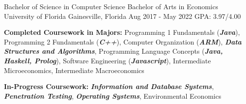 


\begin{cventries}

  \cventryedu
    {Bachelor of Science in Computer Science} %
    {Bachelor of Arts in Economics}
    {University of Florida} %
    {Gainesville, Florida} %
    {Aug 2017 - May 2022} %
    {GPA: 3.97/4.00}
    {
      \begin{cvitems} %
        \item {\textbf{Completed Coursework in Majors:} Programming 1 Fundamentals (\emph{\textbf{Java}}), Programming 2 Fundamentals (\emph{\textbf{C++}}), Computer Organization (\emph{\textbf{ARM}}), \emph{\textbf{Data Structures and Algorithms}}, Programming Language Concepts (\emph{\textbf{Java, Haskell, Prolog}}), Software Engineering (\emph{\textbf{Javascript}}), Intermediate Microeconomics, Intermediate Macroeconomics}
        \item {\textbf{In-Progress Coursework:} \emph{\textbf{Information and Database Systems}}, \emph{\textbf{Penetration Testing}}, \emph{\textbf{Operating Systems}}, Environmental Economics}
      \end{cvitems}
    }

    


\end{cventries}

